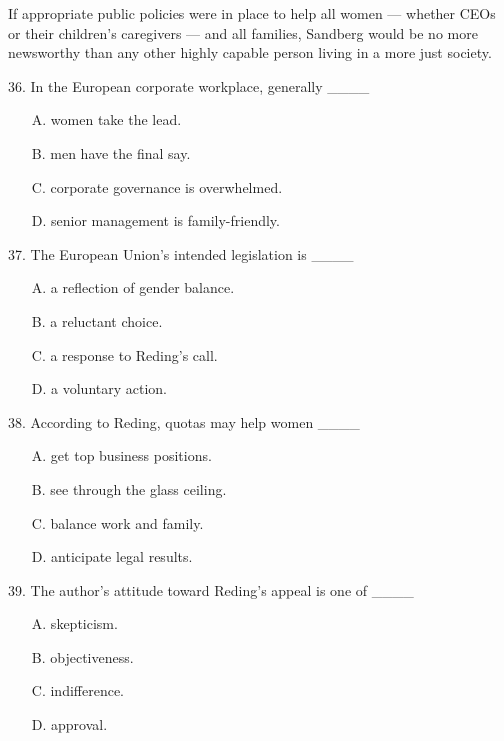 \documentclass[UTF8,11pt]{ctexart}
\begin{document}
If appropriate public policies were in place to help all women — whether CEOs or their children’s caregivers — and all families, Sandberg would be no more newsworthy than any other highly capable person living in a more just society.


36. In the European corporate workplace, generally \_\_\_\_


\begin{itemize}[leftmargin=2em,itemsep=.2em,topsep=.4em]\item[A.] women take the lead.
\item[B.] men have the final say.
\item[C.] corporate governance is overwhelmed.
\item[D.] senior management is family-friendly.
\end{itemize}

37. The European Union’s intended legislation is \_\_\_\_


\begin{itemize}[leftmargin=2em,itemsep=.2em,topsep=.4em]\item[A.] a reflection of gender balance.
\item[B.] a reluctant choice.
\item[C.] a response to Reding’s call.
\item[D.] a voluntary action.
\end{itemize}

38. According to Reding, quotas may help women \_\_\_\_


\begin{itemize}[leftmargin=2em,itemsep=.2em,topsep=.4em]\item[A.] get top business positions.
\item[B.] see through the glass ceiling.
\item[C.] balance work and family.
\item[D.] anticipate legal results.
\end{itemize}

39. The author’s attitude toward Reding’s appeal is one of \_\_\_\_


\begin{itemize}[leftmargin=2em,itemsep=.2em,topsep=.4em]\item[A.] skepticism.
\item[B.] objectiveness.
\item[C.] indifference.
\item[D.] approval.
\end{itemize}
\end{document}
